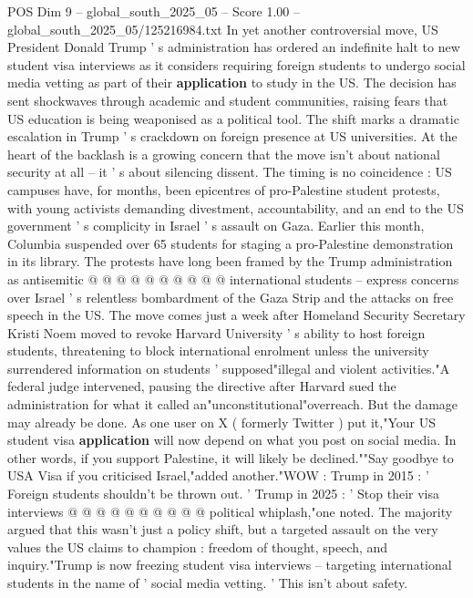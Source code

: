 \begin{textsample}{POS Dim 9 – global\_south\_2025\_05 – Score 1.00 – global\_south\_2025\_05/125216984.txt}  \label{ex:f9_pos_218}
In yet another controversial move, US President Donald Trump ' s administration has ordered an indefinite halt to new student visa interviews as it considers requiring foreign students to undergo social media vetting as part of their \textbf{application} to study in the US.
The decision has sent shockwaves through academic and student communities, raising fears that US education is being weaponised as a political tool.
The shift marks a dramatic escalation in Trump ' s crackdown on foreign presence at US universities.
At the heart of the backlash is a growing concern that the move isn't about national security at all -- it ' s about silencing dissent.
The timing is no coincidence : US campuses have, for months, been epicentres of pro-Palestine student protests, with young activists demanding divestment, accountability, and an end to the US government ' s complicity in Israel ' s assault on Gaza.
Earlier this month, Columbia suspended over 65 students for staging a pro-Palestine demonstration in its library.
The protests have long been framed by the Trump administration as antisemitic @ @ @ @ @ @ @ @ @ @ international students -- express concerns over Israel ' s relentless bombardment of the Gaza Strip and the attacks on free speech in the US.
The move comes just a week after Homeland Security Secretary Kristi Noem moved to revoke Harvard University ' s ability to host foreign students, threatening to block international enrolment unless the university surrendered information on students ' supposed"illegal and violent activities."A federal judge intervened, pausing the directive after Harvard sued the administration for what it called an"unconstitutional"overreach.
But the damage may already be done.
As one user on X ( formerly Twitter ) put it,"Your US student visa \textbf{application} will now depend on what you post on social media.
In other words, if you support Palestine, it will likely be declined.""Say goodbye to USA Visa if you criticised Israel,"added another."WOW : Trump in 2015 : ' Foreign students shouldn't be thrown out. ' Trump in 2025 : ' Stop their visa interviews @ @ @ @ @ @ @ @ @ @ political whiplash,"one noted.
The majority argued that this wasn't just a policy shift, but a targeted assault on the very values the US claims to champion : freedom of thought, speech, and inquiry."Trump is now freezing student visa interviews -- targeting international students in the name of ' social media vetting. ' This isn't about safety.

\end{textsample}
